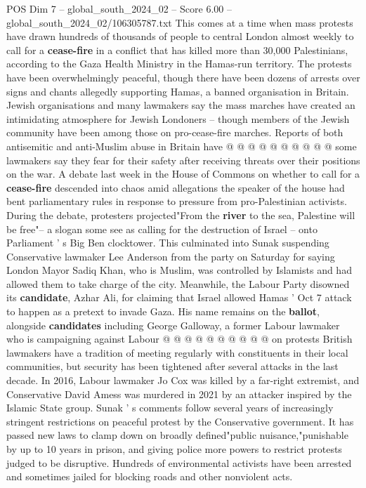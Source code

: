 \begin{textsample}{POS Dim 7 – global\_south\_2024\_02 – Score 6.00 – global\_south\_2024\_02/106305787.txt}
This comes at a time when mass protests have drawn hundreds of thousands of people to central London almost weekly to call for a \textbf{cease-fire} in a conflict that has killed more than 30,000 Palestinians, according to the Gaza Health Ministry in the Hamas-run territory.
The protests have been overwhelmingly peaceful, though there have been dozens of arrests over signs and chants allegedly supporting Hamas, a banned organisation in Britain.
Jewish organisations and many lawmakers say the mass marches have created an intimidating atmosphere for Jewish Londoners -- though members of the Jewish community have been among those on pro-cease-fire marches.
Reports of both antisemitic and anti-Muslim abuse in Britain have @ @ @ @ @ @ @ @ @ @ some lawmakers say they fear for their safety after receiving threats over their positions on the war.
A debate last week in the House of Commons on whether to call for a \textbf{cease-fire} descended into chaos amid allegations the speaker of the house had bent parliamentary rules in response to pressure from pro-Palestinian activists.
During the debate, protesters projected"From the \textbf{river} to the sea, Palestine will be free"-- a slogan some see as calling for the destruction of Israel -- onto Parliament ' s Big Ben clocktower.
This culminated into Sunak suspending Conservative lawmaker Lee Anderson from the party on Saturday for saying London Mayor Sadiq Khan, who is Muslim, was controlled by Islamists and had allowed them to take charge of the city.
Meanwhile, the Labour Party disowned its \textbf{candidate}, Azhar Ali, for claiming that Israel allowed Hamas ' Oct 7 attack to happen as a pretext to invade Gaza.
His name remains on the \textbf{ballot}, alongside \textbf{candidates} including George Galloway, a former Labour lawmaker who is campaigning against Labour @ @ @ @ @ @ @ @ @ @ on protests British lawmakers have a tradition of meeting regularly with constituents in their local communities, but security has been tightened after several attacks in the last decade.
In 2016, Labour lawmaker Jo Cox was killed by a far-right extremist, and Conservative David Amess was murdered in 2021 by an attacker inspired by the Islamic State group.
Sunak ' s comments follow several years of increasingly stringent restrictions on peaceful protest by the Conservative government.
It has passed new laws to clamp down on broadly defined"public nuisance,"punishable by up to 10 years in prison, and giving police more powers to restrict protests judged to be disruptive.
Hundreds of environmental activists have been arrested and sometimes jailed for blocking roads and other nonviolent acts.

\end{textsample}
